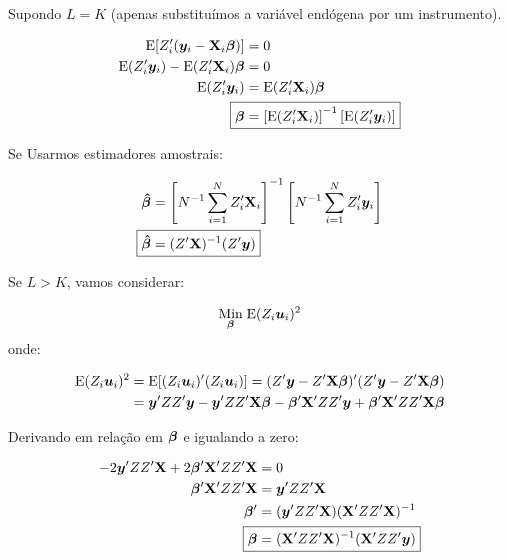 \documentclass[11pt, oneside, a4paper, article]{article}
\numberwithin{equation}{section}
\begin{document}
\begin{description}
\begin{description}
Supondo $L = K$ (apenas substituímos a variável endógena por um instrumento).

\vspace{-1 em}
\begin{align*}
\E[ Z_{i}^{\prime} ( \mbs{y}_{i} - \Xmat_{i} \mbs{\beta} ) ] &= 0
\\
\E( Z_{i}^{\prime} \mbs{y}_{i} ) - \E( Z_{i}^{\prime} \Xmat_{i} ) \mbs{\beta} &= 0
\\
\E( Z_{i}^{\prime} \mbs{y}_{i} ) &= \E( Z_{i}^{\prime} \Xmat_{i} ) \mbs{\beta}
\\
\Aboxed{
\mbs{\beta} &=
\left[ \E( Z_{i}^{\prime} \Xmat_{i} ) \right]^{-1}
\left[ \E( Z_{i}^{\prime} \mbs{y}_{i} ) \right]
}
\end{align*}

Se Usarmos estimadores amostrais:

\vspace{-1 em}
\begin{align*}
\mbs{\hat{\beta}} &=
\left[ N^{-1} \sum_{i=1}^{N} Z_{i}^{\prime} \Xmat_{i} \right]^{-1}
\left[ N^{-1} \sum_{i=1}^{N} Z_{i}^{\prime} \mbs{y}_{i} \right]
\\
\Aboxed{
\mbs{\hat{\beta}} &=
( Z^{\prime} \Xmat )^{-1} ( Z^{\prime} \mbs{y} ) }
\end{align*}

\vspace{1 em}
Se $L > K$, vamos considerar:

\vspace{-1 em}
\begin{align*}
\underset{\boldsymbol{\beta}}{\text{Min}} \;
\text{E}( Z_{i}\boldsymbol{u}_{i} )^2
\end{align*}
\noindent onde:

\vspace{-1 em}
\begin{align*}
\text{E}( Z_{i}\boldsymbol{u}_{i} )^2 
&=
\text{E}[ ( Z_{i}\boldsymbol{u}_{i} )' ( Z_{i}\boldsymbol{u}_{i} ) ]
=
( Z' \boldsymbol{y} - Z' \mathbf{X} \boldsymbol{\beta} )' ( Z' \boldsymbol{y} - Z' \mathbf{X} \boldsymbol{\beta} )
\\
&=
\boldsymbol{y}' ZZ' \boldsymbol{y}
-
\boldsymbol{y}' ZZ' \mathbf{X} \boldsymbol{\beta}
-
\boldsymbol{\beta}' \mathbf{X}' ZZ' \boldsymbol{y}
+
\boldsymbol{\beta}' \mathbf{X}' ZZ' \mathbf{X} \boldsymbol{\beta}
\end{align*}

Derivando em relação em $\boldsymbol{\beta}$ e igualando a zero:

\vspace{-1 em}
\begin{align*}
-2 \mbs{y}' ZZ' \Xmat + 2 \mbs{\beta}'\Xmat' ZZ' \Xmat &= 0
\\
\mbs{\beta}'\Xmat' ZZ' \Xmat &= \mbs{y}' ZZ' \Xmat 
\\
\mbs{\beta}' &= ( \mbs{y}' ZZ' \Xmat ) ( \Xmat' ZZ' \Xmat )^{-1}
\\
\Aboxed{
\mbs{\beta} &= ( \Xmat' ZZ' \Xmat )^{-1} ( \Xmat' ZZ' \mbs{y} ) }
\end{align*}


\end{description}
\end{description}
\end{document}
